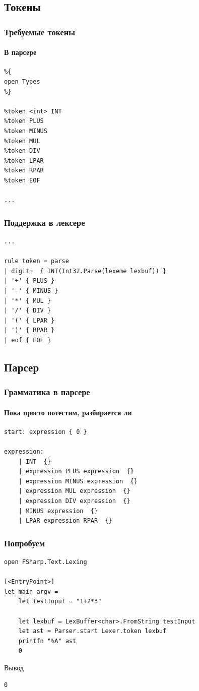 \documentclass[xetex,mathserif,serif]{beamer}
\begin{document}
    \subsection{Токены}

    \begin{frame}[fragile]
        \frametitle{Требуемые токены}
        \framesubtitle{В парсере}
        \begin{verbatim}
%{
open Types
%}

%token <int> INT
%token PLUS
%token MINUS
%token MUL
%token DIV
%token LPAR
%token RPAR
%token EOF

...
        \end{verbatim}
    \end{frame}

    \begin{frame}[fragile]
        \frametitle{Поддержка в лексере}
        \begin{verbatim}
...

rule token = parse
| digit+  { INT(Int32.Parse(lexeme lexbuf)) }
| '+' { PLUS }
| '-' { MINUS }
| '*' { MUL }
| '/' { DIV }
| '(' { LPAR }
| ')' { RPAR }
| eof { EOF }
        \end{verbatim}
    \end{frame}

    \subsection{Парсер}

    \begin{frame}[fragile]
        \frametitle{Грамматика в парсере}
        \framesubtitle{Пока просто потестим, разбирается ли}
        \begin{verbatim}
start: expression { 0 }

expression:
    | INT  {}
    | expression PLUS expression  {}
    | expression MINUS expression  {}
    | expression MUL expression  {}
    | expression DIV expression  {}
    | MINUS expression  {}
    | LPAR expression RPAR  {}
        \end{verbatim}
    \end{frame}

    \begin{frame}[fragile]
        \frametitle{Попробуем}
        \begin{verbatim}
open FSharp.Text.Lexing

[<EntryPoint>]
let main argv =
    let testInput = "1+2*3"

    let lexbuf = LexBuffer<char>.FromString testInput
    let ast = Parser.start Lexer.token lexbuf
    printfn "%A" ast
    0 
        \end{verbatim}
        \begin{exampleblock}{Вывод}
            \begin{verbatim}
0
            \end{verbatim}
        \end{exampleblock}
    \end{frame}
\end{document}
